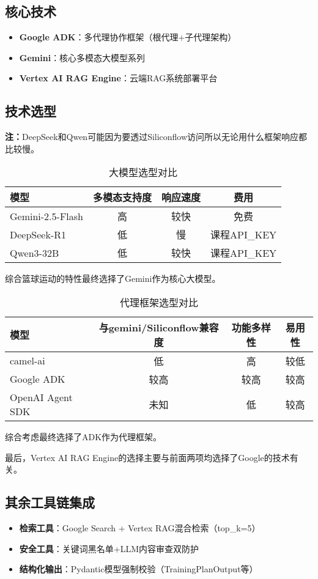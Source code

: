 \documentclass{article}
\theoremstyle{plain}
\theoremstyle{definition}
\theoremstyle{remark}
\begin{document}
\subsection{核心技术}
\begin{itemize}
    \item \textbf{Google ADK}：多代理协作框架（根代理+子代理架构）
    \item \textbf{Gemini}：核心多模态大模型系列
    \item \textbf{Vertex AI RAG Engine}：云端RAG系统部署平台
\end{itemize}


\subsection{技术选型}
\textbf{注：}DeepSeek和Qwen可能因为要透过Siliconflow访问所以无论用什么框架响应都比较慢。
\begin{table}[h]
\caption{大模型选型对比}
\label{model-selection}
\centering
\begin{tabular}{lccc}
\toprule
模型 & 多模态支持度 & 响应速度 & 费用 \\
\midrule
Gemini-2.5-Flash & 高 & 较快 & 免费 \\
DeepSeek-R1 & 低 & 慢 & 课程API_KEY \\
Qwen3-32B & 低 & 较快 & 课程API_KEY \\
\bottomrule
\end{tabular}
\end{table}
综合篮球运动的特性最终选择了Gemini作为核心大模型。

\begin{table}[h]
\caption{代理框架选型对比}
\label{model-selection}
\centering
\begin{tabular}{lccc}
\toprule
模型 & 与gemini/Siliconflow兼容度 & 功能多样性 & 易用性 \\
\midrule
camel-ai & 低 & 高 & 较低 \\
Google ADK & 较高 & 较高 & 较高 \\
OpenAI Agent SDK & 未知 & 低 & 较高 \\
\bottomrule
\end{tabular}
\end{table}
综合考虑最终选择了ADK作为代理框架。

最后，Vertex AI RAG Engine的选择主要与前面两项均选择了Google的技术有关。

\subsection{其余工具链集成}
\begin{itemize}
    呃呃呃好像暂时并没有别的工具链
    篮球专业知识库（规则手册/公众号/专业数据）
    \item \textbf{检索工具}：Google Search + Vertex RAG混合检索（top\_k=5）
    \item \textbf{安全工具}：关键词黑名单+LLM内容审查双防护
    \item \textbf{结构化输出}：Pydantic模型强制校验（TrainingPlanOutput等）
\end{itemize}
\end{document}
